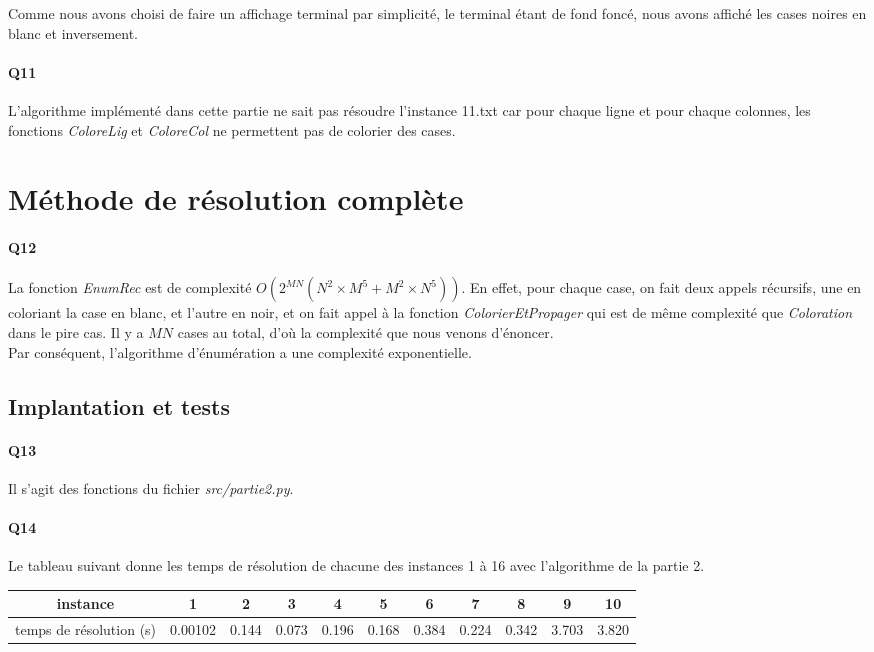 \documentclass[12pt]{article}
\begin{document}
				Comme nous avons choisi de faire un affichage terminal par simplicité, le terminal étant de fond foncé, nous avons affiché les cases noires en blanc et inversement.
		
			\paragraph{Q11}
				L'algorithme implémenté dans cette partie ne sait pas résoudre l'instance 11.txt car pour chaque ligne et pour chaque colonnes, les fonctions \textit{ColoreLig} et \textit{ColoreCol} ne permettent pas de colorier des cases.
	
	
	\section{Méthode de résolution complète}
		
		\paragraph{Q12}
		
			La fonction \textit{EnumRec} est de complexité $ \boxed{O(2^{MN}(N^2 \times M^5 + M^2 \times N^5)) } $. En effet, pour chaque case, on fait deux appels récursifs, une en coloriant la case en blanc, et l'autre en noir, et on fait appel à la fonction \textit{ColorierEtPropager} qui est de même complexité que \textit{Coloration} dans le pire cas. Il y a $ MN $ cases au total, d'où la complexité que nous venons d'énoncer. \\
			Par conséquent, l'algorithme d'énumération a une complexité exponentielle.
		
		\subsection{Implantation et tests}
		
			\paragraph{Q13}
				Il s'agit des fonctions du fichier \textit{src/partie2.py}.
		
			\paragraph{Q14}
				Le tableau suivant donne les temps de résolution de chacune des instances 1 à 16 avec l'algorithme de la partie 2.
				\begin{center}
					\begin{tabular}{|c|c|c|c|c|c|c|c|c|c|c| }
						\hline
						instance & 1 & 2 & 3 & 4 & 5 & 6 & 7 & 8 & 9 & 10 \\ \hline
						temps de résolution (s) & 0.00102 & 0.144 & 0.073 & 0.196 & 0.168 & 0.384 & 0.224 & 0.342 & 3.703 & 3.820 \\ \hline
					\end{tabular}
				\end{center}
			
\end{document}
